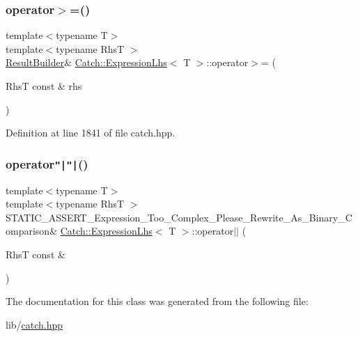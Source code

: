 \subsubsection{\texorpdfstring{operator$>$=()}{operator>=()}}
{\footnotesize\ttfamily template$<$typename T$>$ \\
template$<$typename RhsT $>$ \\
\hyperlink{class_catch_1_1_result_builder}{Result\+Builder}\& \hyperlink{class_catch_1_1_expression_lhs}{Catch\+::\+Expression\+Lhs}$<$ T $>$\+::operator$>$= (\begin{DoxyParamCaption}\item[{RhsT const \&}]{rhs }\end{DoxyParamCaption})\hspace{0.3cm}{\ttfamily [inline]}}



Definition at line 1841 of file catch.\+hpp.

\hypertarget{class_catch_1_1_expression_lhs_a6932b72da79d6c6b03d867772ceac61b}{}\label{class_catch_1_1_expression_lhs_a6932b72da79d6c6b03d867772ceac61b} 
\subsubsection{\texorpdfstring{operator\texttt{"|}\texttt{"|}()}{operator||()}}
{\footnotesize\ttfamily template$<$typename T$>$ \\
template$<$typename RhsT $>$ \\
S\+T\+A\+T\+I\+C\+\_\+\+A\+S\+S\+E\+R\+T\+\_\+\+Expression\+\_\+\+Too\+\_\+\+Complex\+\_\+\+Please\+\_\+\+Rewrite\+\_\+\+As\+\_\+\+Binary\+\_\+\+Comparison\& \hyperlink{class_catch_1_1_expression_lhs}{Catch\+::\+Expression\+Lhs}$<$ T $>$\+::operator$\vert$$\vert$ (\begin{DoxyParamCaption}\item[{RhsT const \&}]{ }\end{DoxyParamCaption})}



The documentation for this class was generated from the following file\+:\begin{DoxyCompactItemize}
\item 
lib/\hyperlink{catch_8hpp}{catch.\+hpp}\end{DoxyCompactItemize}
